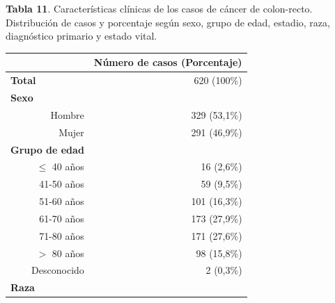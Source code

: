 \newpage

\textbf{Tabla 11}. Características clínicas de los casos de cáncer de colon-recto. Distribución de casos y porcentaje según sexo, grupo de edad, estadio, raza, diagnóstico primario y estado vital.

\begin{table}[H]
	\centering \small
	\begin{tabular}{rr}
		\cline{2-2}
		\multicolumn{1}{l}{}                              & \multicolumn{1}{c}{\textbf{Número de casos (Porcentaje)}} \\ \hline
		\multicolumn{1}{l}{\textbf{Total}}                & 620 (100\%)                                               \\ \hline
		\multicolumn{1}{l}{\textbf{Sexo}}                 &                                                           \\
		Hombre                                            & 329 (53,1\%)                                              \\
		Mujer                                             & 291 (46,9\%)                                              \\ \hline
		\multicolumn{1}{l}{\textbf{Grupo de edad}}        &                                                           \\
		$\leq$ 40 años                                         & 16 (2,6\%)                                                \\
		41-50 años                                        & 59 (9,5\%)                                                \\
		51-60 años                                        & 101 (16,3\%)                                              \\
		61-70 años                                        & 173 (27,9\%)                                              \\
		71-80 años                                        & 171 (27,6\%)                                              \\
		$>$ 80 años                                    & 98 (15,8\%)                                               \\
		Desconocido                                       & 2 (0,3\%)                                                 \\ \hline
		\multicolumn{1}{l}{\textbf{Raza}}                 &                                                           \\

\end{tabular}
\end{table}
